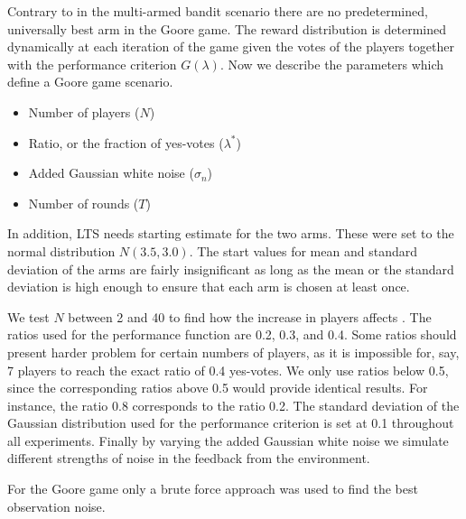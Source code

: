 Contrary to in the multi-armed bandit scenario there are no predetermined, universally best arm in the Goore game.
The reward distribution is determined dynamically at each iteration of the game given the votes of the players together with the performance criterion $G(\lambda)$.
Now we describe the parameters which define a Goore game scenario.

\begin{itemize}
    \item Number of players ($N$)
    \item Ratio, or the fraction of yes-votes ($\lambda^*$)
    \item Added Gaussian white noise ($\sigma_n$)
    \item Number of rounds ($T$)
\end{itemize}

In addition, LTS needs starting estimate for the two arms.
These were set to the normal distribution $N(3.5,3.0)$.
The start values for mean and standard deviation of the arms are fairly insignificant as long as the mean or the standard deviation is high enough to ensure that each arm is chosen at least once.

We test $N$ between 2 and 40 to find how the increase in players affects \obstar{}.
The ratios used for the performance function are 0.2, 0.3, and 0.4.
Some ratios should present harder problem for certain numbers of players, as it is impossible for, say, 7 players to reach the exact ratio of 0.4 yes-votes.
We only use ratios below 0.5, since the corresponding ratios above 0.5 would provide identical results.
For instance, the ratio 0.8 corresponds to the ratio 0.2.
The standard deviation of the Gaussian distribution used for the performance criterion is set at 0.1 throughout all experiments.
Finally by varying the added Gaussian white noise we simulate different strengths of noise in the feedback from the environment.

For the Goore game only a brute force approach was used to find the best observation noise.




